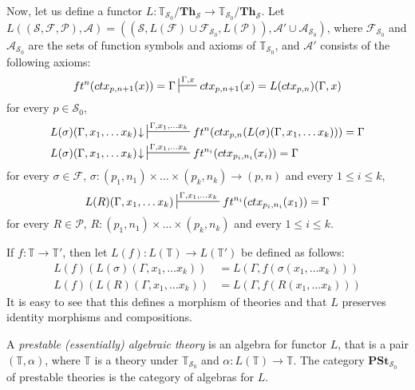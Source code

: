 \documentclass[reqno]{amsart}
\theoremstyle{definition}
\theoremstyle{remark}
\newcommand{\cat}[1]{\mathbf{#1}}
\newcommand{\Th}{\cat{Th}}
\newcommand{\PSt}{\cat{PSt}}
\numberwithin{figure}{section}
\begin{document}
Now, let us define a functor $L : \mathbb{T}_{\mathcal{S}_0}/\Th_\mathcal{S} \to \mathbb{T}_{\mathcal{S}_0}/\Th_\mathcal{S}$.
Let $L((\mathcal{S}, \mathcal{F}, \mathcal{P}), \mathcal{A}) = ((\mathcal{S}, L(\mathcal{F}) \cup \mathcal{F}_{\mathcal{S}_0}, L(\mathcal{P})), \mathcal{A}' \cup \mathcal{A}_{\mathcal{S}_0})$,
where $\mathcal{F}_{\mathcal{S}_0}$ and $\mathcal{A}_{\mathcal{S}_0}$ are the sets of function symbols and axioms of $\mathbb{T}_{\mathcal{S}_0}$, and $\mathcal{A}'$ consists of the following axioms:
\[ ft^n(ctx_{p,n+1}(x)) = \Gamma \sststile{}{\Gamma,x} ctx_{p,n+1}(x) = L(ctx_{p,n})(\Gamma,x) \]
for every $p \in \mathcal{S}_0$,
\begin{align*}
L(\sigma)(\Gamma, x_1, \ldots x_k)\!\downarrow & \sststile{}{\Gamma, x_1, \ldots x_k} ft^n(ctx_{p,n}(L(\sigma)(\Gamma, x_1, \ldots x_k))) = \Gamma \\
L(\sigma)(\Gamma, x_1, \ldots x_k)\!\downarrow & \sststile{}{\Gamma, x_1, \ldots x_k} ft^{n_i}(ctx_{p_i,n_i}(x_i)) = \Gamma
\end{align*}
for every $\sigma \in \mathcal{F}$, $\sigma : (p_1,n_1) \times \ldots \times (p_k,n_k) \to (p,n)$ and every $1 \leq i \leq k$,
\[ L(R)(\Gamma, x_1, \ldots x_k) \sststile{}{\Gamma, x_1, \ldots x_k} ft^{n_i}(ctx_{p_i,n_i}(x_1)) = \Gamma \]
for every $R \in \mathcal{P}$, $R : (p_1,n_1) \times \ldots \times (p_k,n_k)$ and every $1 \leq i \leq k$.

If $f : \mathbb{T} \to \mathbb{T}'$, then let $L(f) : L(\mathbb{T}) \to L(\mathbb{T}')$ be defined as follows:
\begin{align*}
L(f)(L(\sigma)(\Gamma, x_1, \ldots x_k)) & = L(\Gamma, f(\sigma(x_1, \ldots x_k))) \\
L(f)(L(R)(\Gamma, x_1, \ldots x_k)) & = L(\Gamma, f(R(x_1, \ldots x_k)))
\end{align*}
It is easy to see that this defines a morphism of theories and that $L$ preserves identity morphisms and compositions.

\begin{defn}
A \emph{prestable (essentially) algebraic theory} is an algebra for functor $L$,
that is a pair $(\mathbb{T},\alpha)$, where $\mathbb{T}$ is a theory under $\mathbb{T}_{\mathcal{S}_0}$ and $\alpha : L(\mathbb{T}) \to \mathbb{T}$.
The category $\PSt_{\mathcal{S}_0}$ of prestable theories is the category of algebras for $L$.
\end{defn}
\end{document}
